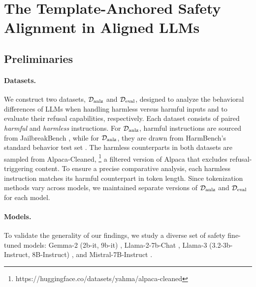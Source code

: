 \section{The Template-Anchored Safety
Alignment in Aligned LLMs}
\label{sec:rq1}




\subsection{Preliminaries}

\paragraph{Datasets.}
We construct two datasets, ${\mathcal{D}}_{\text{anlz}}$ and ${\mathcal{D}}_{\text{eval}}$, designed to analyze the behavioral differences of LLMs when handling harmless versus harmful inputs and to evaluate their refusal capabilities, respectively. 
Each dataset consists of paired \textit{harmful} and \textit{harmless} instructions. For ${\mathcal{D}}_{\text{anlz}}$, harmful instructions are sourced from JailbreakBench \cite{chao2024jailbreakbench}, while for ${\mathcal{D}}_{\text{anlz}}$, they are drawn from HarmBench's standard behavior test set \cite{mazeika2024harmbench}. The harmless counterparts in both datasets are sampled from Alpaca-Cleaned,
\footnote{https://huggingface.co/datasets/yahma/alpaca-cleaned}
a filtered version of Alpaca \cite{alpaca} that excludes refusal-triggering content.
To ensure a precise comparative analysis, each harmless instruction matches its harmful counterpart in token length. Since tokenization methods vary across models, we maintained separate versions of ${\mathcal{D}}_{\text{anlz}}$ and ${\mathcal{D}}_{\text{eval}}$ for each model.


\paragraph{Models.}
To validate the generality of our findings, we study a diverse set of safety fine-tuned models: Gemma-2 (2b-it, 9b-it) \cite{team2024gemma}, Llama-2-7b-Chat \cite{touvron2023llama}, Llama-3 (3.2-3b-Instruct, 8B-Instruct) \cite{dubey2024llama}, and Mistral-7B-Instruct \cite{jiang2023mistral}.



